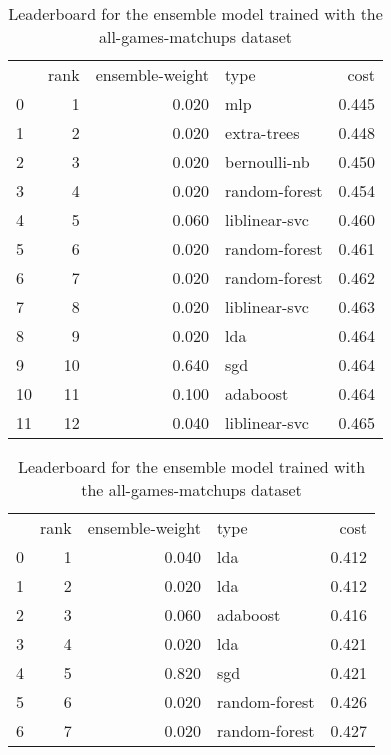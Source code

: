 \begin{table}[]
	\centering
	\begin{tabular}{lrrlr}
		   & rank & ensemble-weight & type          & cost  \\
		0  & 1    & 0.020           & mlp           & 0.445 \\
		1  & 2    & 0.020           & extra-trees   & 0.448 \\
		2  & 3    & 0.020           & bernoulli-nb  & 0.450 \\
		3  & 4    & 0.020           & random-forest & 0.454 \\
		4  & 5    & 0.060           & liblinear-svc & 0.460 \\
		5  & 6    & 0.020           & random-forest & 0.461 \\
		6  & 7    & 0.020           & random-forest & 0.462 \\
		7  & 8    & 0.020           & liblinear-svc & 0.463 \\
		8  & 9    & 0.020           & lda           & 0.464 \\
		9  & 10   & 0.640           & sgd           & 0.464 \\
		10 & 11   & 0.100           & adaboost      & 0.464 \\
		11 & 12   & 0.040           & liblinear-svc & 0.465 \\
	\end{tabular}

	\caption{Leaderboard for the ensemble model trained with the all-games-matchups dataset}
	\label{tab:lb-all-games-matchups-autoencode}
\end{table}

\begin{table}[]
	\centering
	\begin{tabular}{lrrlr}
		  & rank & ensemble-weight & type          & cost  \\
		0 & 1    & 0.040           & lda           & 0.412 \\
		1 & 2    & 0.020           & lda           & 0.412 \\
		2 & 3    & 0.060           & adaboost      & 0.416 \\
		3 & 4    & 0.020           & lda           & 0.421 \\
		4 & 5    & 0.820           & sgd           & 0.421 \\
		5 & 6    & 0.020           & random-forest & 0.426 \\
		6 & 7    & 0.020           & random-forest & 0.427 \\
	\end{tabular}

	\caption{Leaderboard for the ensemble model trained with the all-games-matchups dataset}
	\label{tab:lb-all-games-matchups-PCA}
\end{table}

